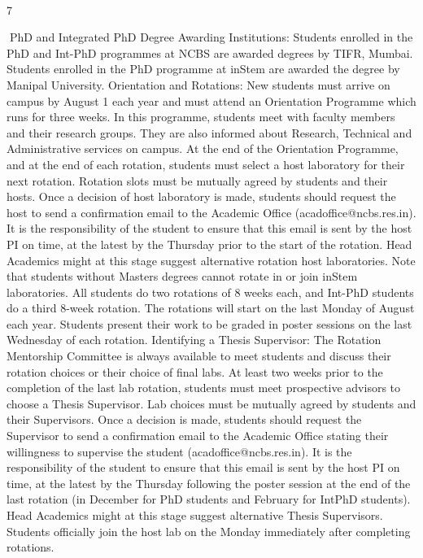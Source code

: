 \documentclass[a4paper,10pt]{article}
\begin{document}
  

7	
  

PhD and Integrated PhD
Degree Awarding Institutions: Students enrolled in the PhD and Int-PhD programmes at
NCBS are awarded degrees by TIFR, Mumbai. Students enrolled in the PhD programme at
inStem are awarded the degree by Manipal University.
Orientation and Rotations: New students must arrive on campus by August 1 each year
and must attend an Orientation Programme which runs for three weeks. In this programme,
students meet with faculty members and their research groups. They are also informed about
Research, Technical and Administrative services on campus. At the end of the Orientation
Programme, and at the end of each rotation, students must select a host laboratory for their
next rotation. Rotation slots must be mutually agreed by students and their hosts. Once a
decision of host laboratory is made, students should request the host to send a confirmation
email to the Academic Office (acadoffice@ncbs.res.in). It is the responsibility of the student
to ensure that this email is sent by the host PI on time, at the latest by the Thursday prior to
the start of the rotation. Head Academics might at this stage suggest alternative rotation host
laboratories. Note that students without Masters degrees cannot rotate in or join inStem
laboratories. All students do two rotations of 8 weeks each, and Int-PhD students do a third
8-week rotation. The rotations will start on the last Monday of August each year. Students
present their work to be graded in poster sessions on the last Wednesday of each rotation.
Identifying a Thesis Supervisor: The Rotation Mentorship Committee is always available
to meet students and discuss their rotation choices or their choice of final labs. At least two
weeks prior to the completion of the last lab rotation, students must meet prospective
advisors to choose a Thesis Supervisor. Lab choices must be mutually agreed by students
and their Supervisors. Once a decision is made, students should request the Supervisor to
send a confirmation email to the Academic Office stating their willingness to supervise the
student (acadoffice@ncbs.res.in). It is the responsibility of the student to ensure that this
email is sent by the host PI on time, at the latest by the Thursday following the poster
session at the end of the last rotation (in December for PhD students and February for IntPhD students). Head Academics might at this stage suggest alternative Thesis Supervisors.
Students officially join the host lab on the Monday immediately after completing rotations.
\end{document}
